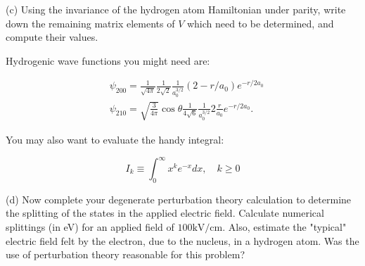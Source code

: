 \documentclass[12pt]{article}
\begin{document}
(c) Using the invariance of the hydrogen atom Hamiltonian under parity, write down the remaining matrix elements of $V$ which need to be determined, and compute their values.

Hydrogenic wave functions you might need are:

$$
\begin{aligned}
& \psi_{200}=\frac{1}{\sqrt{4 \pi}} \frac{1}{2 \sqrt{2}} \frac{1}{a_{0}^{3 / 2}}\left(2-r / a_{0}\right) e^{-r / 2 a_{0}} \\
& \psi_{210}=\sqrt{\frac{3}{4 \pi}} \cos \theta \frac{1}{4 \sqrt{6}} \frac{1}{a_{0}^{3 / 2}} 2 \frac{r}{a_{0}} e^{-r / 2 a_{0}} .
\end{aligned}
$$

You may also want to evaluate the handy integral:

$$
I_{k} \equiv \int_{0}^{\infty} x^{k} e^{-x} d x, \quad k \geq 0
$$

(d) Now complete your degenerate perturbation theory calculation to determine the splitting of the states in the applied electric field. Calculate numerical splittings (in eV) for an applied field of $100 \mathrm{kV} / \mathrm{cm}$. Also, estimate the "typical" electric field felt by the electron, due to the nucleus, in a hydrogen atom. Was the use of perturbation theory reasonable for this problem?
\end{document}
